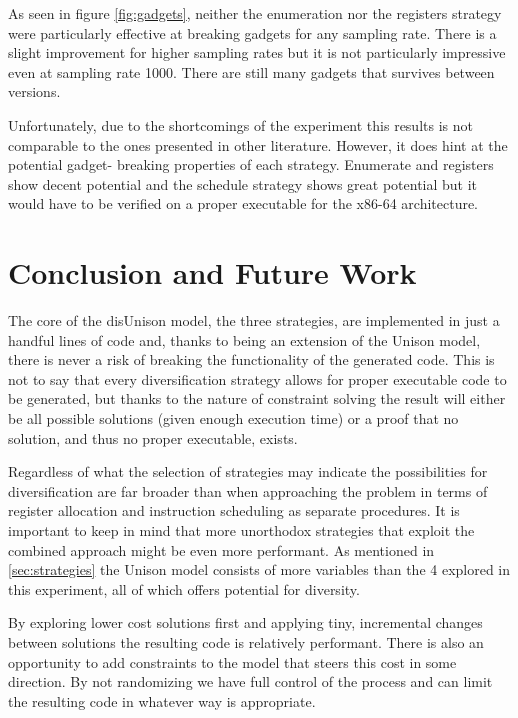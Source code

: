 As seen in figure \ref{fig:gadgets}, neither the enumeration nor the registers strategy
were particularly effective at breaking gadgets for any sampling rate. There is a slight
improvement for higher sampling rates but it is not particularly impressive even at
sampling rate 1000. There are still many gadgets that survives between versions.

Unfortunately, due to the shortcomings of the experiment this results is not comparable to
the ones presented in other literature. However, it does hint at the potential gadget-
breaking properties of each strategy. Enumerate and registers show decent potential and the
schedule strategy shows great potential but it would have to be verified on a proper
executable for the x86-64 architecture.

\section{Conclusion and Future Work}

The core of the disUnison model, the three strategies, are implemented in just a handful
lines of code and, thanks to being an extension of the Unison model, there is never a risk
of breaking the functionality of the generated code. This is not to say that every
diversification strategy allows for proper executable code to be generated, but thanks to
the nature of constraint solving the result will either be all possible solutions
(given enough execution time) or a proof that no solution, and thus no proper executable,
exists.

Regardless of what the selection of strategies may indicate the possibilities for
diversification are far broader than when approaching the problem in terms of register
allocation and instruction scheduling as separate procedures. It is important to keep in
mind that more unorthodox strategies that exploit the combined approach might be even
more performant. As mentioned in \ref{sec:strategies} the Unison model consists of more
variables than the 4 explored in this experiment, all of which offers potential for
diversity.

By exploring lower cost solutions first and applying tiny, incremental changes between
solutions the resulting code is relatively performant. There is also an opportunity to
add constraints to the model that steers this cost in some direction. By not randomizing
we have full control of the process and can limit the resulting code in whatever way is
appropriate.

